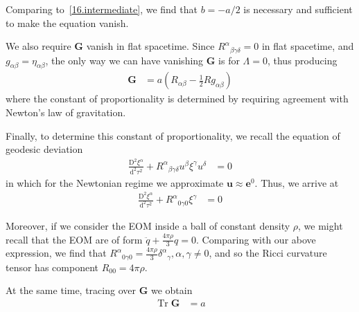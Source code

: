 \documentclass[12pt]{report}
\newcommand{\bm}[1]{\boldsymbol{\mathbf{#1}}}
\DeclareMathOperator{\Tr}{Tr}
\begin{document}
\begin{description}
        Comparing to~\eqref{16.intermediate}, we find that $b = -a/2$ is
        necessary and sufficient to make the equation vanish.

        We also require $\bm{G}$ vanish in flat spacetime. Since
        ${R^\alpha}_{\beta\gamma\delta} = 0$ in flat spacetime, and
        $g_{\alpha\beta} = \eta_{\alpha\beta}$, the only way we can have
        vanishing $\bm{G}$ is for $\Lambda = 0$, thus producing
        \begin{align*}
            \bm{G} &= a\left( R_{\alpha\beta} - \frac{1}{2}Rg_{\alpha\beta} \right)
        \end{align*}
        where the constant of proportionality is determined by requiring
        agreement with Newton's law of gravitation.

        Finally, to determine this constant of proportionality, we recall the
        equation of geodesic deviation
        \begin{align*}
            \frac{\mathrm{D}^2\xi^\alpha}{\mathrm{d}^2\tau^2} +
                {R^{\alpha}}_{\beta\gamma\delta}
                u^\beta\xi^\gamma u^\delta &= 0
        \end{align*}
        in which for the Newtonian regime we approximate $\bm{u} \approx
        \bm{e}^0$. Thus, we arrive at
        \begin{align*}
            \frac{\mathrm{D}^2\xi^\alpha}{\mathrm{d}^2\tau^2} +
                {R^{\alpha}}_{0\gamma 0}
                \xi^\gamma &= 0
        \end{align*}

        Moreover, if we consider the EOM inside a ball of constant density
        $\rho$, we might recall that the EOM are of form
        $\ddot{q} + \frac{4\pi\rho}{3}q = 0$. Comparing with our above
        expression, we find that ${R^\alpha}_{0\gamma 0} =
        \frac{4\pi\rho}{3}{\delta^\alpha}_\gamma, \alpha, \gamma \neq 0$,
        and so the Ricci curvature tensor has component $R_{00} = 4\pi \rho$.

        At the same time, tracing over $\bm{G}$ we obtain
        \begin{align*}
            \Tr \bm{G} &= a
        \end{align*}
\end{description}
\end{document}

